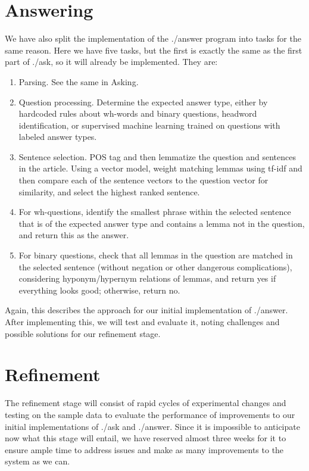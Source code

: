 \documentclass{article}
\begin{document}
\section{Answering}
We have also split the implementation of the ./answer program into tasks for the same reason. Here we have five tasks, but the first is exactly the same as the first part of ./ask, so it will already be implemented. They are:
\begin{enumerate}
  \item Parsing. See the same in Asking.
  \item Question processing. Determine the expected answer type, either by hardcoded rules about wh-words and binary questions, headword identification, or supervised machine learning trained on questions with labeled answer types.
  \item Sentence selection. POS tag and then lemmatize the question and sentences in the article. Using a vector model, weight matching lemmas using tf-idf and then compare each of the sentence vectors to the question vector for similarity, and select the highest ranked sentence.
  \item For wh-questions, identify the smallest phrase within the selected sentence that is of the expected answer type and contains a lemma not in the question, and return this as the answer.
  \item For binary questions, check that all lemmas in the question are matched in the selected sentence (without negation or other dangerous complications), considering hyponym/hypernym relations of lemmas, and return yes if everything looks good; otherwise, return no.
\end{enumerate}
Again, this describes the approach for our initial implementation of ./answer. After implementing this, we will test and evaluate it, noting challenges and possible solutions for our refinement stage.
\section{Refinement}
The refinement stage will consist of rapid cycles of experimental changes and testing on the sample data to evaluate the performance of improvements to our initial implementations of ./ask and ./answer. Since it is impossible to anticipate now what this stage will entail, we have reserved almost three weeks for it to ensure ample time to address issues and make as many improvements to the system as we can.
\end{document}
